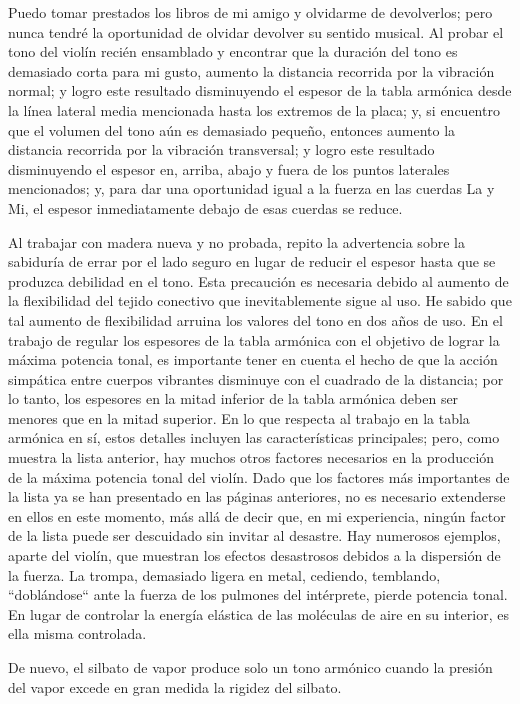 \documentclass[12pt]{book}
\begin{document}
Puedo tomar prestados los libros de mi amigo y olvidarme de devolverlos; pero nunca tendré la oportunidad de olvidar devolver su sentido musical. Al probar el tono del violín recién ensamblado y encontrar que la duración del tono es demasiado corta para mi gusto, aumento la distancia recorrida por la vibración normal; y logro este resultado disminuyendo el espesor de la tabla armónica desde la línea lateral media mencionada hasta los extremos de la placa; y, si encuentro que el volumen del tono aún es demasiado pequeño, entonces aumento la distancia recorrida por la vibración transversal; y logro este resultado disminuyendo el espesor en, arriba, abajo y fuera de los puntos laterales mencionados; y, para dar una oportunidad igual a la fuerza en las cuerdas La y Mi, el espesor inmediatamente debajo de esas cuerdas se reduce.

Al trabajar con madera nueva y no probada, repito la advertencia sobre la sabiduría de errar por el lado seguro en lugar de reducir el espesor hasta que se produzca debilidad en el tono. Esta precaución es necesaria debido al aumento de la flexibilidad del tejido conectivo que inevitablemente sigue al uso. He sabido que tal aumento de flexibilidad arruina los valores del tono en dos años de uso. En el trabajo de regular los espesores de la tabla armónica con el objetivo de lograr la máxima potencia tonal, es importante tener en cuenta el hecho de que la acción simpática entre cuerpos vibrantes disminuye con el cuadrado de la distancia; por lo tanto, los espesores en la mitad inferior de la tabla armónica deben ser menores que en la mitad superior. En lo que respecta al trabajo en la tabla armónica en sí, estos detalles incluyen las características principales; pero, como muestra la lista anterior, hay muchos otros factores necesarios en la producción de la máxima potencia tonal del violín. Dado que los factores más importantes de la lista ya se han presentado en las páginas anteriores, no es necesario extenderse en ellos en este momento, más allá de decir que, en mi experiencia, ningún factor de la lista puede ser descuidado sin invitar al desastre. Hay numerosos ejemplos, aparte del violín, que muestran los efectos desastrosos debidos a la dispersión de la fuerza. La trompa, demasiado ligera en metal, cediendo, temblando, ``doblándose`` ante la fuerza de los pulmones del intérprete, pierde potencia tonal. En lugar de controlar la energía elástica de las moléculas de aire en su interior, es ella misma controlada.

De nuevo, el silbato de vapor produce solo un tono armónico cuando la presión del vapor excede en gran medida la rigidez del silbato.
\end{document}
